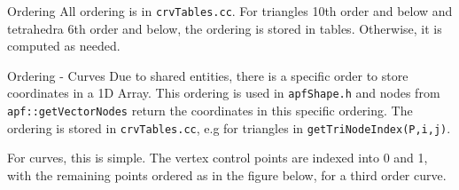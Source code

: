\documentclass[12pt]{beamer}
\newcommand{\spa}{\vspace{0.5cm}\newline}
\begin{document}
\begin{frame}{Ordering}
All ordering is in \texttt{crvTables.cc}. For triangles 10th order and below and tetrahedra 6th order and below, the ordering is stored in tables. Otherwise, it is computed as needed. 
\end{frame}
\begin{frame}{Ordering - Curves}
Due to shared entities, there is a specific order to store coordinates in a 1D Array. This ordering is used in \texttt{apfShape.h} and nodes from \texttt{apf::getVectorNodes} return the coordinates in this specific ordering. The ordering is stored in \texttt{crvTables.cc}, e.g for triangles in \texttt{getTriNodeIndex(P,i,j)}. \spa

For curves, this is simple. The vertex control points are indexed into 0 and 1, with the remaining points ordered as in the figure below, for a third order curve.
\begin{figure}
\centering
{}
\hspace{1cm}
\end{figure}
\end{frame}
\end{document}
